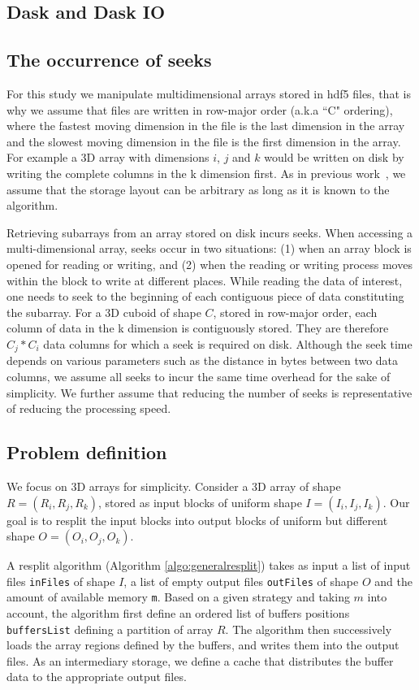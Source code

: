 \documentclass[conference]{IEEEtran}
\begin{document}
\subsection{Dask and Dask IO}


\subsection{The occurrence of seeks}
For this study we manipulate multidimensional arrays stored in hdf5 files,
that is why we assume that files are written in row-major order (a.k.a ``C" ordering),
where the fastest moving dimension in the file is the last dimension in the
array and the slowest moving dimension in the file is the first dimension
in the array. For example a 3D array with dimensions $i$, $j$ and $k$ would be
written on disk by writing the complete columns in the k dimension first.
As in previous work~\cite{seqalgorithms}, we assume that the storage layout can
be arbitrary as long as it is known to the algorithm.

Retrieving subarrays from an array stored on disk incurs seeks. When accessing a
multi-dimensional array, seeks occur in two situations: (1) when an array block
is opened for reading or writing, and (2) when the reading or writing process
moves within the block to write at different places. While reading the data of
interest, one needs to seek to the beginning of each contiguous piece of data
constituting the subarray. For a 3D cuboid of shape $C$, stored in row-major order,
each column of data in the k dimension is contiguously stored. They are therefore
$C_j * C_i$ data columns for which a seek is required on disk. Although the seek
time depends on various parameters such as the distance in bytes between two
data columns, we assume all seeks to incur the same time overhead for the sake
of simplicity. We further assume that reducing the number of seeks is
representative of reducing the processing speed.

\subsection{Problem definition}
We focus on 3D arrays for simplicity. Consider a 3D array of shape $R =
(R_i, R_j, R_k)$, stored as input blocks of uniform shape $I =
(I_i, I_j, I_k)$. Our goal is to resplit the input blocks into output
blocks of uniform but different shape $O = (O_i, O_j, O_k)$.

A resplit algorithm (Algorithm \ref{algo:generalresplit}) takes as input a
list of input files \texttt{inFiles} of shape $I$, a list of empty output
files \texttt{outFiles} of shape $O$ and the amount of available memory
\texttt{m}. Based on a given strategy and taking $m$ into account, the
algorithm first define an ordered list of buffers positions \texttt{buffersList}
defining a partition of array $R$. The algorithm then successively loads the array
regions defined by the buffers, and writes them into the output files. As an
intermediary storage, we define a cache that distributes the buffer data to the
appropriate output files.
\end{document}

